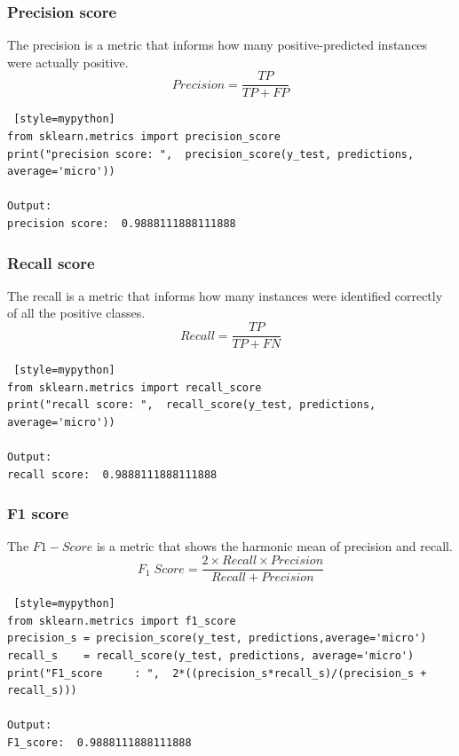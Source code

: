 \subsubsection{Precision score}
The precision is a metric that informs how many positive-predicted instances were actually positive.
\[
Precision= \frac{TP}{TP+FP}
\]
\begin{lstlisting} [style=mypython]
from sklearn.metrics import precision_score
print("precision score: ",  precision_score(y_test, predictions, average='micro'))

Output:
precision score:  0.9888111888111888
\end{lstlisting}

\subsubsection{Recall score}
The recall is a metric that informs how many instances were identified correctly of all the positive classes.
\[
Recall= \frac{TP}{TP+FN}
\]
\begin{lstlisting} [style=mypython]
from sklearn.metrics import recall_score
print("recall score: ",  recall_score(y_test, predictions, average='micro'))

Output:
recall score:  0.9888111888111888
\end{lstlisting}

\subsubsection{F1 score}
The $F1-Score$ is a metric that shows the harmonic mean of precision and recall.
\[
F_1 \;Score=\frac{2\times Recall\times Precision}{Recall+Precision}
\]

\begin{lstlisting} [style=mypython]
from sklearn.metrics import f1_score
precision_s = precision_score(y_test, predictions,average='micro')
recall_s    = recall_score(y_test, predictions, average='micro')
print("F1_score     : ",  2*((precision_s*recall_s)/(precision_s + recall_s)))

Output:
F1_score:  0.9888111888111888
\end{lstlisting}


